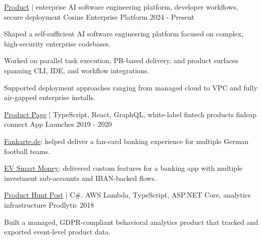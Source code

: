 

\begin{cventries}

  \cventry
    {\href{https://cosine.sh/}{Product} | enterprise AI software engineering platform, developer workflows, secure deployment}
    {Cosine Enterprise Platform}
    {}
    {2024 - Present}
    {
      \begin{cvitems}
        \item {Shaped a self-sufficient AI software engineering platform focused on complex, high-security enterprise codebases.}
        \item {Worked on parallel task execution, PR-based delivery, and product surfaces spanning CLI, IDE, and workflow integrations.}
        \item {Supported deployment approaches ranging from managed cloud to VPC and fully air-gapped enterprise installs.}
      \end{cvitems}
    }

  \cventry
    {\href{https://connect.finleap.com/digital-bank/}{Product Page} | TypeScript, React, GraphQL, white-label fintech products}
    {finleap connect App Launches}
    {}
    {2019 - 2020}
    {
      \begin{cvitems}
        \item {\href{https://play.google.com/store/apps/details?id=de.fankarte.digibank}{Fankarte.de}: helped deliver a fan-card banking experience for multiple German football teams.}
        \item {\href{https://apps.apple.com/us/app/e-v-smart-money/id1508366285}{EV Smart Money}: delivered custom features for a banking app with multiple investment sub-accounts and IBAN-backed flows.}
      \end{cvitems}
    }

  \cventry
    {\href{https://www.producthunt.com/posts/prodlytic}{Product Hunt Post} | C\#, AWS Lambda, TypeScript, ASP.NET Core, analytics infrastructure}
    {Prodlytic}
    {}
    {2018}
    {
      \begin{cvitems}
        \item {Built a managed, GDPR-compliant behavioral analytics product that tracked and exported event-level product data.}
      \end{cvitems}
    }

\end{cventries}
